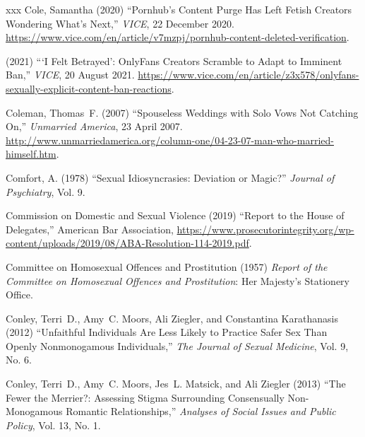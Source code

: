 \documentclass[]{jlreq} \usepackage{mystyle}
\begin{document}
\begin{thebibliography}{xxx}
Cole, Samantha (2020) ``Pornhub's Content Purge Has Left Fetish Creators
  Wondering What's Next,'' \emph{VICE}, 22 December 2020.
  \url{https://www.vice.com/en/article/v7mzpj/pornhub-content-deleted-verification}.

 \bysame{}  (2021) ```I Felt Betrayed': OnlyFans Creators Scramble to Adapt to
  Imminent Ban,'' \emph{VICE}, 20 August 2021.
  \url{https://www.vice.com/en/article/z3x578/onlyfans-sexually-explicit-content-ban-reactions}.

Coleman, Thomas~F. (2007) ``Spouseless Weddings with Solo Vows Not Catching
  On,'' \emph{Unmarried America}, 23 April 2007.
  \url{http://www.unmarriedamerica.org/column-one/04-23-07-man-who-married-himself.htm}.

Comfort, A. (1978) ``Sexual Idiosyncrasies: Deviation or Magic?'' \textit{
  Journal of Psychiatry}, Vol. 9.

{Commission on Domestic and Sexual Violence} (2019) ``Report to the House of
  Delegates,'' American Bar Association,
  \url{https://www.prosecutorintegrity.org/wp-content/uploads/2019/08/ABA-Resolution-114-2019.pdf}.

{Committee on Homosexual Offences and Prostitution} (1957)  \textit{ Report of
  the Committee on Homosexual Offences and Prostitution}: Her Majesty's
  Stationery Office.

Conley, Terri~D., Amy~C. Moors, Ali Ziegler, and Constantina Karathanasis
  (2012) ``Unfaithful Individuals Are Less Likely to Practice Safer Sex Than
  Openly Nonmonogamous Individuals,'' \textit{ The Journal of Sexual Medicine},
  Vol. 9, No. 6.

Conley, Terri~D., Amy~C. Moors, Jes~L. Matsick, and Ali Ziegler (2013) ``The
  Fewer the Merrier?: Assessing Stigma Surrounding Consensually Non-Monogamous
  Romantic Relationships,'' \textit{ Analyses of Social Issues and Public
  Policy}, Vol. 13, No. 1.


\end{thebibliography}
\end{document}
